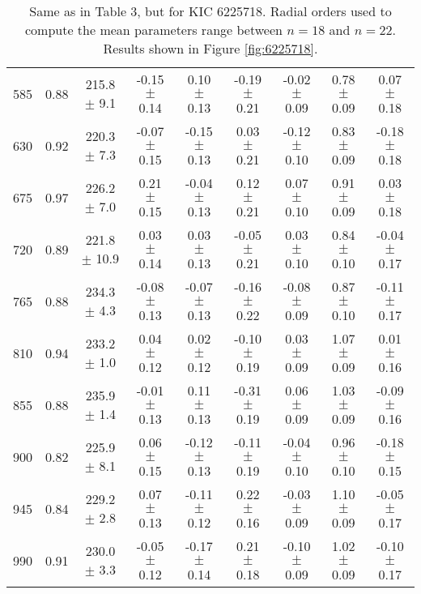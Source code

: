 \documentclass[twocolumn]{aastex61}%
\begin{document}
\begin{table*}[ht]
\begin{tabular}{ccc|ccccc|c}
585 & 0.88 & 215.8 $\pm$ 9.1 & -0.15 $\pm$ 0.14 & 0.10 $\pm$ 0.13 & -0.19 $\pm$ 0.21 & -0.02 $\pm$ 0.09 & 0.78 $\pm$ 0.09 & 0.07 $\pm$ 0.18\\
630 & 0.92 & 220.3 $\pm$ 7.3 & -0.07 $\pm$ 0.15 & -0.15 $\pm$ 0.13 & 0.03 $\pm$ 0.21 & -0.12 $\pm$ 0.10 & 0.83 $\pm$ 0.09 & -0.18 $\pm$ 0.18\\
675 & 0.97 & 226.2 $\pm$ 7.0 & 0.21 $\pm$ 0.15 & -0.04 $\pm$ 0.13 & 0.12 $\pm$ 0.21 & 0.07 $\pm$ 0.10 & 0.91 $\pm$ 0.09 & 0.03 $\pm$ 0.18\\
720 & 0.89 & 221.8 $\pm$ 10.9 & 0.03 $\pm$ 0.14 & 0.03 $\pm$ 0.13 & -0.05 $\pm$ 0.21 & 0.03 $\pm$ 0.10 & 0.84 $\pm$ 0.10 & -0.04 $\pm$ 0.17\\
765 & 0.88 & 234.3 $\pm$ 4.3 & -0.08 $\pm$ 0.13 & -0.07 $\pm$ 0.13 & -0.16 $\pm$ 0.22 & -0.08 $\pm$ 0.09 & 0.87 $\pm$ 0.10 & -0.11 $\pm$ 0.17\\
810 & 0.94 & 233.2 $\pm$ 1.0 & 0.04 $\pm$ 0.12 & 0.02 $\pm$ 0.12 & -0.10 $\pm$ 0.19 & 0.03 $\pm$ 0.09 & 1.07 $\pm$ 0.09 & 0.01 $\pm$ 0.16\\
855 & 0.88 & 235.9 $\pm$ 1.4 & -0.01 $\pm$ 0.13 & 0.11 $\pm$ 0.13 & -0.31 $\pm$ 0.19 & 0.06 $\pm$ 0.09 & 1.03 $\pm$ 0.09 & -0.09 $\pm$ 0.16\\
900 & 0.82 & 225.9 $\pm$ 8.1 & 0.06 $\pm$ 0.15 & -0.12 $\pm$ 0.13 & -0.11 $\pm$ 0.19 & -0.04 $\pm$ 0.10 & 0.96 $\pm$ 0.10 & -0.18 $\pm$ 0.15\\
945 & 0.84 & 229.2 $\pm$ 2.8 & 0.07 $\pm$ 0.13 & -0.11 $\pm$ 0.12 & 0.22 $\pm$ 0.16 & -0.03 $\pm$ 0.09 & 1.10 $\pm$ 0.09 & -0.05 $\pm$ 0.17\\
990 & 0.91 & 230.0 $\pm$ 3.3 & -0.05 $\pm$ 0.12 & -0.17 $\pm$ 0.14 & 0.21 $\pm$ 0.18 & -0.10 $\pm$ 0.09 & 1.02 $\pm$ 0.09 & -0.10 $\pm$ 0.17\\
\end{tabular}
\caption{Same as in Table 3, but for KIC 6225718. Radial orders used to compute the mean parameters range between $n=18$ and $n=22$. Results shown in Figure \ref{fig:6225718}.}\label{tab:6225718}\vspace{-1cm}
\end{table*}
\end{document}
